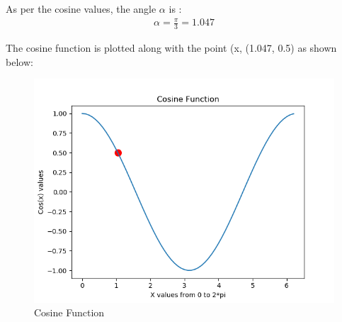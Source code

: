 \documentclass[journal,12pt,twocolumn]{IEEEtran}
\begin{document}
As per the cosine values, the angle $\alpha$ is :
\begin{align}
 \alpha =  \frac{\pi}{3} = 1.047
\end{align}
  
The cosine function is plotted along with the point (x, (1.047, 0.5) as shown below:  
\begin{figure}[h]
    \centering
    \includegraphics[width=\columnwidth]{assignment_2.png}
    \caption{Cosine Function}
    \label{fig:cosine}
\end{figure}
\end{document}
